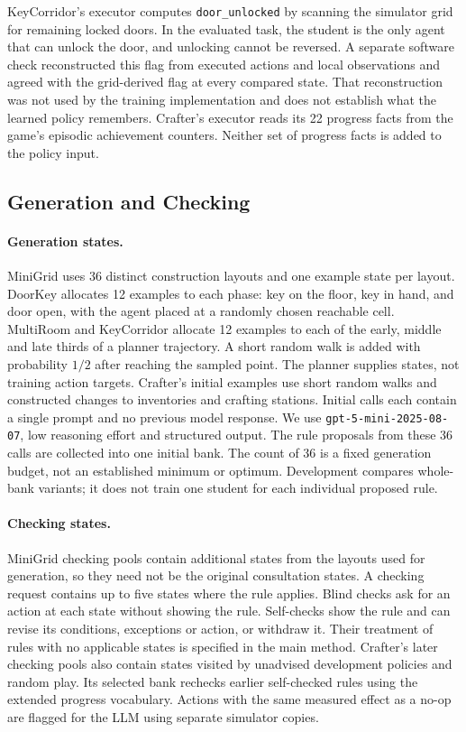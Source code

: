 KeyCorridor's executor computes \texttt{door\_unlocked} by scanning
the simulator grid for remaining locked doors. In the evaluated task,
the student is the only agent that can unlock the door, and unlocking
cannot be reversed. A separate software check reconstructed this flag
from executed actions and local observations and agreed with the
grid-derived flag at every compared state. That reconstruction was
not used by the training implementation and does not establish what
the learned policy remembers. Crafter's executor reads its 22 progress
facts from the game's episodic achievement counters. Neither set of
progress facts is added to the policy input.

\subsection{Generation and Checking}
\label{app:bank_construction_details}

\paragraph{Generation states.}
MiniGrid uses 36 distinct construction layouts and one example state
per layout. DoorKey allocates 12 examples to each phase: key on the
floor, key in hand, and door open, with the agent placed at a randomly
chosen reachable cell. MultiRoom and KeyCorridor allocate 12 examples
to each of the early, middle and late thirds of a planner trajectory.
A short random walk is added with probability $1/2$ after reaching
the sampled point.
The planner supplies states, not training action targets.
Crafter's initial examples use short random walks and constructed
changes to inventories and crafting stations. Initial calls each
contain a single prompt and no previous model response. We use
\texttt{gpt-5-mini-2025-08-07}, low reasoning effort and structured output.
The rule proposals from these 36 calls are collected into one initial
bank. The count of 36 is a fixed generation budget, not an established
minimum or optimum. Development compares whole-bank variants; it
does not train one student for each individual proposed rule.

\paragraph{Checking states.}
MiniGrid checking pools contain additional states from the layouts
used for generation, so they need not be the original consultation
states. A checking request contains up to five states where the rule
applies. Blind checks ask for an action at each state without showing
the rule. Self-checks show the rule and can revise its conditions,
exceptions or action, or withdraw it. Their treatment of rules with
no applicable states is specified in the main method.
Crafter's later checking pools also contain states visited by
unadvised development policies and random play. Its selected bank
rechecks earlier self-checked rules using the extended progress
vocabulary. Actions with the same measured effect as a no-op are
flagged for the LLM using separate simulator copies.

